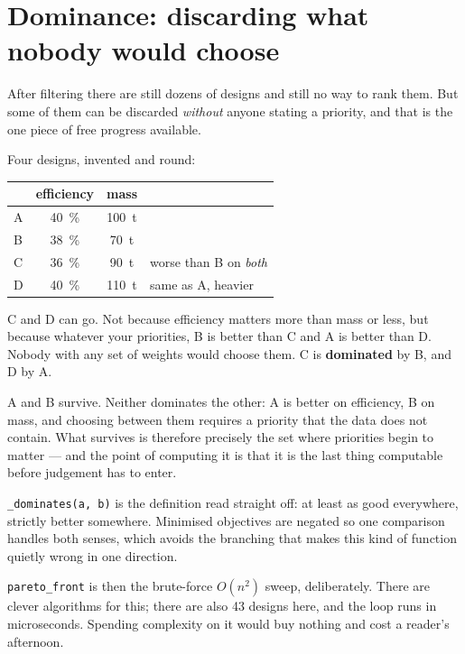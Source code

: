 \documentclass[11pt,a4paper]{report}
\newcommand{\code}[1]{\texttt{\small #1}}
\begin{document}
\section{Dominance: discarding what nobody would choose}

After filtering there are still dozens of designs and still no way to rank
them. But some of them can be discarded \emph{without} anyone stating a
priority, and that is the one piece of free progress available.

Four designs, invented and round:

\begin{center}
\begin{tabular}{lccl}
\toprule
 & efficiency & mass & \\
\midrule
A & \SI{40}{\percent} & \SI{100}{\tonne} & \\
B & \SI{38}{\percent} & \SI{70}{\tonne} & \\
C & \SI{36}{\percent} & \SI{90}{\tonne} & worse than B on \emph{both} \\
D & \SI{40}{\percent} & \SI{110}{\tonne} & same as A, heavier \\
\bottomrule
\end{tabular}
\end{center}

C and D can go. Not because efficiency matters more than mass or less, but
because whatever your priorities, B is better than C and A is better than D.
Nobody with any set of weights would choose them. C is \textbf{dominated} by
B, and D by A.

A and B survive. Neither dominates the other: A is better on efficiency, B
on mass, and choosing between them requires a priority that the data does
not contain. What survives is therefore precisely the set where priorities
begin to matter --- and the point of computing it is that it is the last
thing computable before judgement has to enter.

\begin{choicebox}

\code{\_dominates(a, b)} is the definition read straight off: at least as
good everywhere, strictly better somewhere. Minimised objectives are negated
so one comparison handles both senses, which avoids the branching that makes
this kind of function quietly wrong in one direction.

\code{pareto\_front} is then the brute-force $O(n^2)$ sweep, deliberately.
There are clever algorithms for this; there are also \num{43} designs here,
and the loop runs in microseconds. Spending complexity on it would buy
nothing and cost a reader's afternoon.
\end{choicebox}
\end{document}

